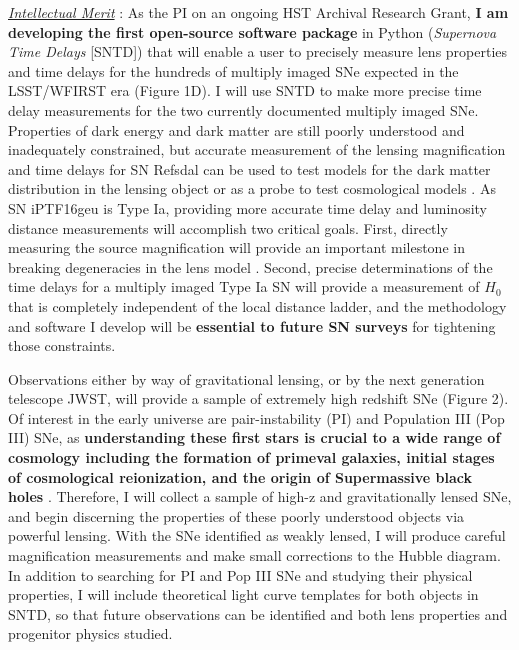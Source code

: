 \noindent\underline{\textit{Intellectual Merit}} :
As the PI on an ongoing HST Archival Research Grant, \textbf{I am
developing the first open-source software package} in Python
(\textit{Supernova Time Delays} [SNTD]) that will enable a user to
precisely measure lens properties and time delays for the hundreds of
multiply imaged SNe expected in the LSST/WFIRST era (Figure 1D). I
will use SNTD to make more precise time delay measurements for the two
currently documented multiply imaged SNe. Properties of dark energy
and dark matter are still poorly understood and inadequately
constrained, but accurate measurement of the lensing magnification and
time delays for SN Refsdal can be used to test models for the dark
matter distribution in the lensing
object \citep{Rodney:2015a,Rodney:2016} or as a probe to test
cosmological models \citep{Suyu:2014}. As SN iPTF16geu is Type Ia,
providing more accurate time delay and luminosity distance
measurements will accomplish two critical goals. First, directly
measuring the source magnification will provide an important milestone
in breaking degeneracies in the lens
model \citep{Kolatt:1998,Oguri:2003b}. Second, precise determinations
of the time delays for a multiply imaged Type Ia SN will provide a
measurement of $H_0$ that is completely independent of the local
distance ladder, and the methodology and software I develop will
be \textbf{essential to future SN surveys} for tightening those
constraints.

Observations either by way of gravitational lensing, or by the next
generation telescope JWST, will provide a sample of extremely high
redshift SNe (Figure 2). Of interest in the early universe are
pair-instability (PI) and Population III (Pop III) SNe,
as \textbf{understanding these first stars is crucial to a wide range
of cosmology including the formation of primeval galaxies, initial
stages of cosmological reionization, and the origin of Supermassive
black holes} \citep{Whalen:2013}. Therefore, I will collect a sample
of high-z and gravitationally lensed SNe, and begin discerning
the properties of these poorly understood objects via powerful
lensing. With the SNe identified as weakly lensed, I will produce
careful magnification measurements and make small corrections
to the Hubble diagram. In addition to searching for PI and Pop III SNe
and studying their physical properties, I will include theoretical
light curve templates for both objects in SNTD, so that future
observations can be identified and both lens properties and progenitor
physics studied.


